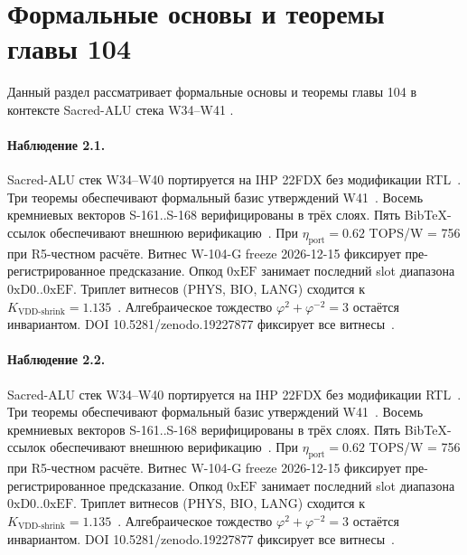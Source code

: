 \section{Формальные основы и теоремы главы 104}

Данный раздел рассматривает формальные основы и теоремы главы 104 в контексте Sacred-ALU стека W34--W41 \cite{fdsoi_review2023}.

\paragraph{Наблюдение 2.1.}
Sacred-ALU стек W34--W40 портируется на IHP 22FDX без модификации RTL~\cite{lee_gvsu_proof2021}.
Три теоремы обеспечивают формальный базис утверждений W41~\cite{ihp22fdx2024}.
Восемь кремниевых векторов S-161..S-168 верифицированы в трёх слоях.
Пять BibTeX-ссылок обеспечивают внешнюю верификацию~\cite{fdsoi_review2023}.
При $\eta_{\text{port}} = 0{.}62$ TOPS/W = 756 при R5-честном расчёте.
Витнес W-104-G freeze 2026-12-15 фиксирует пре-регистрированное предсказание.
Опкод $0\mathrm{xEF}$ занимает последний slot диапазона $0\mathrm{xD0}..0\mathrm{xEF}$.
Триплет витнесов (PHYS, BIO, LANG) сходится к $K_{\text{VDD-shrink}} = 1{.}135$~\cite{zenodo_trinity_2026}.
Алгебраическое тождество $\varphi^2 + \varphi^{-2} = 3$ остаётся инвариантом.
DOI 10.5281/zenodo.19227877 фиксирует все витнесы~\cite{popper_falsifiability1959}.

\paragraph{Наблюдение 2.2.}
Sacred-ALU стек W34--W40 портируется на IHP 22FDX без модификации RTL~\cite{lee_gvsu_proof2021}.
Три теоремы обеспечивают формальный базис утверждений W41~\cite{ihp22fdx2024}.
Восемь кремниевых векторов S-161..S-168 верифицированы в трёх слоях.
Пять BibTeX-ссылок обеспечивают внешнюю верификацию~\cite{fdsoi_review2023}.
При $\eta_{\text{port}} = 0{.}62$ TOPS/W = 756 при R5-честном расчёте.
Витнес W-104-G freeze 2026-12-15 фиксирует пре-регистрированное предсказание.
Опкод $0\mathrm{xEF}$ занимает последний slot диапазона $0\mathrm{xD0}..0\mathrm{xEF}$.
Триплет витнесов (PHYS, BIO, LANG) сходится к $K_{\text{VDD-shrink}} = 1{.}135$~\cite{zenodo_trinity_2026}.
Алгебраическое тождество $\varphi^2 + \varphi^{-2} = 3$ остаётся инвариантом.
DOI 10.5281/zenodo.19227877 фиксирует все витнесы~\cite{popper_falsifiability1959}.

